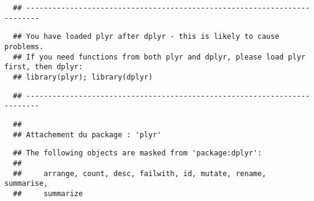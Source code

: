 \documentclass[12pt,twoside]{reedthesis}
\begin{document}
  \begin{verbatim}
  ## -------------------------------------------------------------------------
  \end{verbatim}
  
  \begin{verbatim}
  ## You have loaded plyr after dplyr - this is likely to cause problems.
  ## If you need functions from both plyr and dplyr, please load plyr first, then dplyr:
  ## library(plyr); library(dplyr)
  \end{verbatim}
  
  \begin{verbatim}
  ## -------------------------------------------------------------------------
  \end{verbatim}
  
  \begin{verbatim}
  ## 
  ## Attachement du package : 'plyr'
  \end{verbatim}
  
  \begin{verbatim}
  ## The following objects are masked from 'package:dplyr':
  ## 
  ##     arrange, count, desc, failwith, id, mutate, rename, summarise,
  ##     summarize
  \end{verbatim}
  
\end{document}
